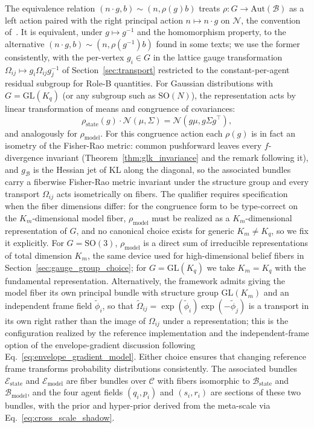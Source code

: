 \documentclass[11pt]{article}
\begin{document}
The equivalence relation $(n\cdot g, b) \sim (n, \rho(g)b)$ treats $\rho: G \to \mathrm{Aut}(\mathcal{B})$ as a left action paired with the right principal action $n \mapsto n\cdot g$ on $\mathcal{N}$, the convention of~\cite{Nakahara2003}. It is equivalent, under $g \mapsto g^{-1}$ and the homomorphism property, to the alternative $(n\cdot g, b) \sim (n, \rho(g^{-1})b)$ found in some texts; we use the former consistently, with the per-vertex $g_i \in G$ in the lattice gauge transformation $\Omega_{ij} \mapsto g_i \Omega_{ij} g_j^{-1}$ of Section~\ref{sec:transport} restricted to the constant-per-agent residual subgroup for Role-B quantities. For Gaussian distributions with $G = \mathrm{GL}(K_q)$ (or any subgroup such as $\mathrm{SO}(N)$), the representation acts by linear transformation of means and congruence of covariances:
\begin{equation}
\rho_{\mathrm{state}}(g) \cdot \mathcal{N}(\mu, \Sigma) = \mathcal{N}(g\mu, g\Sigma g^\top),
\end{equation}
and analogously for $\rho_{\mathrm{model}}$. For this congruence action each $\rho(g)$ is in fact an isometry of the Fisher-Rao metric: common pushforward leaves every $f$-divergence invariant (Theorem~\ref{thm:glk_invariance} and the remark following it), and $g_{\mathcal{B}}$ is the Hessian jet of KL along the diagonal, so the associated bundles carry a fiberwise Fisher-Rao metric invariant under the structure group and every transport $\Omega_{ij}$ acts isometrically on fibers. The qualifier requires specification when the fiber dimensions differ: for the congruence form to be type-correct on the $K_m$-dimensional model fiber, $\rho_{\mathrm{model}}$ must be realized as a $K_m$-dimensional representation of $G$, and no canonical choice exists for generic $K_m \neq K_q$, so we fix it explicitly. For $G = \mathrm{SO}(3)$, $\rho_{\mathrm{model}}$ is a direct sum of irreducible representations of total dimension $K_m$, the same device used for high-dimensional belief fibers in Section~\ref{sec:gauge_group_choice}; for $G = \mathrm{GL}(K_q)$ we take $K_m = K_q$ with the fundamental representation. Alternatively, the framework admits giving the model fiber its own principal bundle with structure group $\mathrm{GL}(K_m)$ and an independent frame field $\tilde{\phi}_i$, so that $\tilde{\Omega}_{ij} = \exp(\tilde{\phi}_i)\exp(-\tilde{\phi}_j)$ is a transport in its own right rather than the image of $\Omega_{ij}$ under a representation; this is the configuration realized by the reference implementation and the independent-frame option of the envelope-gradient discussion following Eq.~\eqref{eq:envelope_gradient_model}. Either choice ensures that changing reference frame transforms probability distributions consistently. The associated bundles $\mathcal{E}_{\mathrm{state}}$ and $\mathcal{E}_{\mathrm{model}}$ are fiber bundles over $\mathcal{C}$ with fibers isomorphic to $\mathcal{B}_{\mathrm{state}}$ and $\mathcal{B}_{\mathrm{model}}$, and the four agent fields $(q_i, p_i)$ and $(s_i, r_i)$ are sections of these two bundles, with the prior and hyper-prior derived from the meta-scale via Eq.~\eqref{eq:cross_scale_shadow}.
\end{document}

